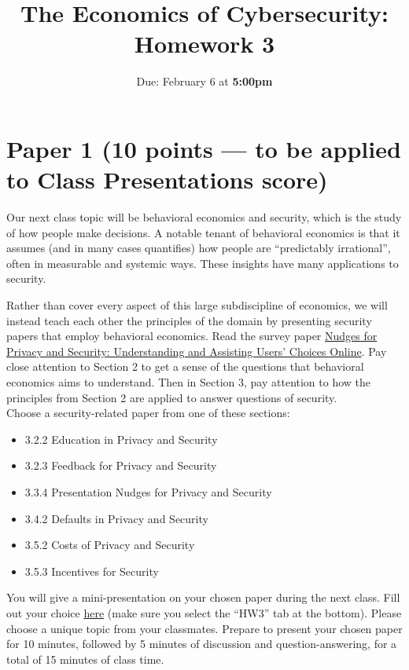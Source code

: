 \documentclass[11pt]{article}
\title{The Economics of Cybersecurity: Homework 3}
\date{Due: February 6 at {\bf 5:00pm}}
\author{}
\begin{document}
\maketitle


\section*{Paper 1 (10 points --- to be applied to Class Presentations score)}

Our next class topic will be behavioral economics and security, which is the study of how people make decisions. A notable tenant of behavioral economics is that it assumes (and in many cases quantifies) how people are ``predictably irrational'', often in measurable and systemic ways. These insights have many applications to security.

Rather than cover every aspect of this large subdiscipline of economics, we will instead teach each other the principles of the domain by presenting security papers that employ behavioral economics. Read the survey paper \href{https://dl.acm.org/doi/abs/10.1145/3054926}{Nudges for Privacy and Security: Understanding and Assisting Users' Choices Online}. Pay close attention to Section 2 to get a sense of the questions that behavioral economics aims to understand. Then in Section 3, pay attention to how the principles from Section 2 are applied to answer questions of security. 
\\ 

\noindent Choose a security-related paper from one of these sections:

\begin{itemize}
    \item 3.2.2 Education in Privacy and Security
    \item 3.2.3 Feedback for Privacy and Security
    \item 3.3.4 Presentation Nudges for Privacy and Security
    \item 3.4.2 Defaults in Privacy and Security
    \item 3.5.2 Costs of Privacy and Security
    \item 3.5.3 Incentives for Security
\end{itemize}


You will give a mini-presentation on your chosen paper during the next class. Fill out your choice \href{https://docs.google.com/spreadsheets/d/1SdaMpeCo4CE8o0U_irGhWmVXJYHybRWoiX4uwZYMhCE/edit?usp=sharing}{here} (make sure you select the ``HW3'' tab at the bottom). Please choose a unique topic from your classmates. Prepare to present your chosen paper for 10 minutes, followed by 5 minutes of discussion and question-answering, for a total of 15 minutes of class time.
\end{document}
